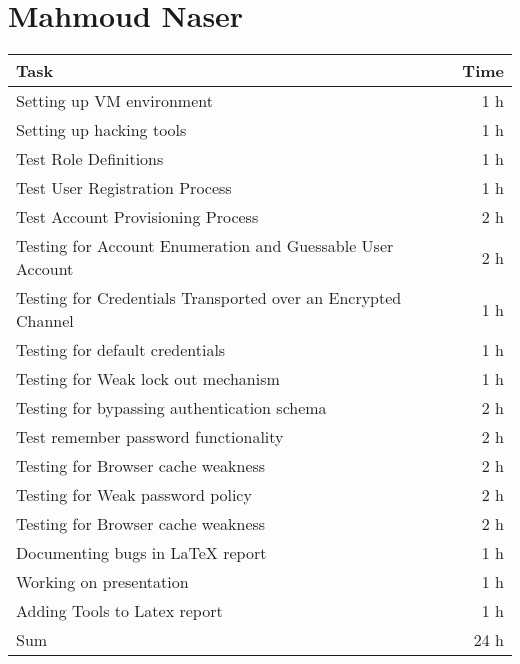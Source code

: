 \clearpage
\section*{Mahmoud Naser}
\begin{table}[h!tpb]
  \centering
  \begin{tabularx}{\textwidth}{X r}
    \toprule
      Task & Time \\
    \midrule
      Setting up VM environment & 1 h \\
      Setting up hacking tools & 1 h \\

      Test Role Definitions & 1 h \\
      Test User Registration Process & 1 h \\
      Test Account Provisioning Process & 2 h \\
      Testing for Account Enumeration and Guessable User Account & 2 h \\

      Testing for Credentials Transported over an Encrypted Channel & 1 h \\
      Testing for default credentials & 1 h \\
      Testing for Weak lock out mechanism & 1 h \\
      Testing for bypassing authentication schema & 2 h \\
      Test remember password functionality & 2 h \\
      Testing for Browser cache weakness & 2 h \\
      Testing for Weak password policy & 2 h \\
      Testing for Browser cache weakness & 2 h \\

      Documenting bugs in \LaTeX{} report & 1 h \\
      Working on presentation & 1 h \\
      Adding Tools to Latex report & 1 h \\
    \midrule
      Sum & 24 h \\
    \bottomrule
  \end{tabularx}
\end{table}
